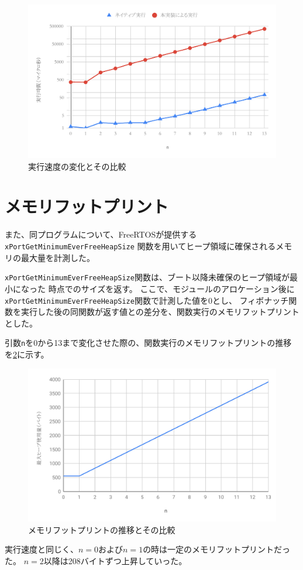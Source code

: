 \begin{figure}[htbp]
  \caption{実行速度の変化とその比較}
  \label{fig:exec_time}
  \begin{center}
    \includegraphics[bb=0 0 600 370,width=12cm]{img/fib_time.pdf}
  \end{center}
\end{figure}

\section{メモリフットプリント}

また、同プログラムについて、FreeRTOSが提供する\verb|xPortGetMinimumEverFreeHeapSize|
関数を用いてヒープ領域に確保されるメモリの最大量を計測した。

\verb|xPortGetMinimumEverFreeHeapSize|関数は、ブート以降未確保のヒープ領域が最小になった
時点でのサイズを返す。
ここで、モジュールのアロケーション後に\verb|xPortGetMinimumEverFreeHeapSize|関数で計測した値を0とし、
フィボナッチ関数を実行した後の同関数が返す値との差分を、関数実行のメモリフットプリントとした。

引数\verb|n|を0から13まで変化させた際の、関数実行のメモリフットプリントの推移を\ref{fig:heap_size}に示す。

\begin{figure}[htbp]
  \caption{メモリフットプリントの推移とその比較}
  \label{fig:heap_size}
  \begin{center}
    \includegraphics[bb=0 0 600 370,width=12cm]{img/heap_size.pdf}
  \end{center}
\end{figure}

実行速度と同じく、$n=0$および$n=1$の時は一定のメモリフットプリントだった。
$n=2$以降は208バイトずつ上昇していった。
